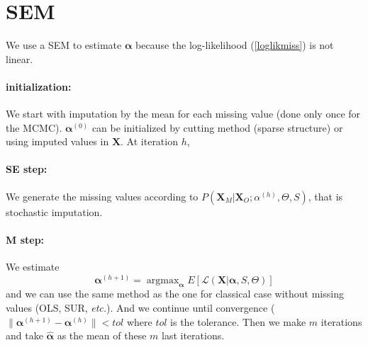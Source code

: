 \documentclass[11pt,a4paper]{report}
\begin{document}
%
%

\section{SEM}
	We use a SEM \cite{celeux1986algorithme} to estimate $\boldsymbol{\alpha}$ because the log-likelihood (\ref{loglikmiss}) is not linear. 
	\paragraph{initialization:} We start with imputation by the mean for each missing value (done only once for the MCMC). $\boldsymbol{\alpha}^{(0)}$ can be initialized by cutting method	(sparse structure) or using imputed values in $\boldsymbol{X}$.
	At iteration $h$,
	\paragraph{SE step:}
		We generate the missing values according to $P(\boldsymbol{X}_M|\boldsymbol{X}_O; \alpha^{(h)},\Theta,S)$, that is stochastic imputation.
	\paragraph{M step:}
		We estimate 
		\begin{equation}
	\boldsymbol{\alpha}^{(h+1)}=\operatorname{argmax}_{\boldsymbol{\alpha}}E\left[\mathcal{L}(\boldsymbol{X}|\boldsymbol{\alpha},S,\Theta) \right]
\end{equation}
and we can use the same method as the one for classical case without missing values (OLS, SUR, {\it etc.}).
		And we continue until convergence ($\parallel \boldsymbol{\alpha}^{(h+1)} - \boldsymbol{\alpha}^{(h)}\parallel < tol $ where $tol$ is the tolerance. Then we make $m$ iterations and take $\hat{\boldsymbol{\alpha}}$ as the mean of these $m$ last iterations.
		
\end{document}
